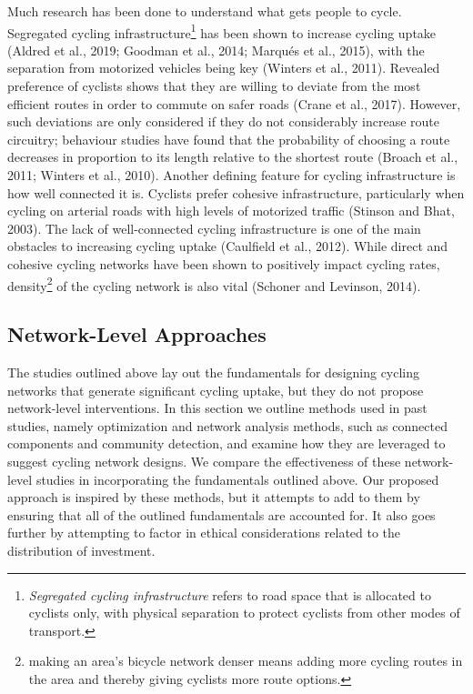 \documentclass[
]{article}
\begin{document}
Much research has been done to understand what gets people to cycle.
Segregated cycling infrastructure\footnote{\emph{Segregated cycling infrastructure}
  refers to road space that is allocated to cyclists only, with physical
  separation to protect cyclists from other modes of transport.} has been
shown to increase cycling uptake (Aldred et al., 2019; Goodman et al., 2014; Marqués et al., 2015), with the separation from motorized
vehicles being key (Winters et al., 2011). Revealed preference of
cyclists shows that they are willing to deviate from the most efficient
routes in order to commute on safer roads (Crane et al., 2017).
However, such deviations are only considered if they do not considerably
increase route circuitry; behaviour studies have found that the
probability of choosing a route decreases in proportion to its length
relative to the shortest route (Broach et al., 2011; Winters et al., 2010).
Another defining feature for cycling infrastructure is how well
connected it is. Cyclists prefer cohesive infrastructure, particularly
when cycling on arterial roads with high levels of motorized traffic
(Stinson and Bhat, 2003). The lack of well-connected cycling
infrastructure is one of the main obstacles to increasing cycling uptake
(Caulfield et al., 2012). While direct and cohesive cycling networks
have been shown to positively impact cycling rates, density\footnote{making an
  area's bicycle network denser means adding more cycling routes in the
  area and thereby giving cyclists more route options.} of the cycling
network is also vital (Schoner and Levinson, 2014).

\hypertarget{network-level-approaches}{%
\subsection{Network-Level Approaches}\label{network-level-approaches}}

The studies outlined above lay out the fundamentals for designing
cycling networks that generate significant cycling uptake, but they do
not propose network-level interventions. In this section we outline
methods used in past studies, namely optimization and network
analysis methods, such as connected components and community
detection, and examine how they are leveraged to suggest cycling network
designs. We compare the effectiveness of these network-level studies in
incorporating the fundamentals outlined above.
Our proposed approach is inspired by these methods, but it attempts to add to them
by ensuring that all of the outlined fundamentals are accounted for. It
also goes further by attempting to factor in ethical considerations
related to the distribution of investment.
\end{document}
